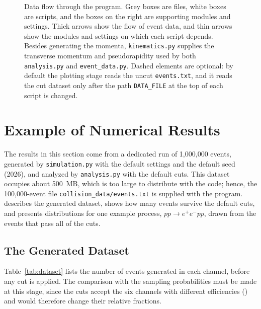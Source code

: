 \documentclass{article}
\begin{document}
\begin{figure}[H]
\caption{Data flow through the program. Grey boxes are files, white boxes are scripts, and the boxes on the right are supporting modules and settings. Thick arrows show the flow of event data, and thin arrows show the modules and settings on which each script depends. Besides generating the momenta, \texttt{kinematics.py} supplies the transverse momentum and pseudorapidity used by both \texttt{analysis.py} and \texttt{event\_data.py}. Dashed elements are optional: by default the plotting stage reads the uncut \texttt{events.txt}, and it reads the cut dataset only after the path \texttt{DATA\_FILE} at the top of each script is changed.}
\label{fig:chart_flow}
\end{figure}
\FloatBarrier

\section{Example of Numerical Results}
\label{sec:numerical_results}
The results in this section come from a dedicated run of 1{,}000{,}000 events, generated by \texttt{simulation.py} with the default settings and the default seed (2026), and analyzed by \texttt{analysis.py} with the default cuts. This dataset occupies about 500~MB, which is too large to distribute with the code; hence, the 100{,}000-event file \texttt{collision\_data/events.txt} is supplied with the program.  describes the generated dataset,  shows how many events survive the default cuts, and  presents distributions for one example process, $pp \to e^+e^-pp$, drawn from the events that pass all of the cuts.

\subsection{The Generated Dataset}
\label{ssec:dataset}
Table~\ref{tab:dataset} lists the number of events generated in each channel, before any cut is applied. The comparison with the sampling probabilities must be made at this stage, since the cuts accept the six channels with different efficiencies () and would therefore change their relative fractions.
\end{document}
